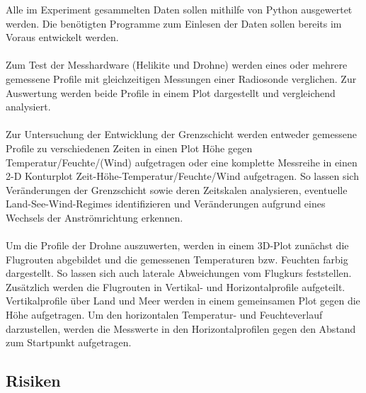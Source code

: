 \documentclass[a4paper,11pt,DIV=calc,tablecaptionabove,headinclude,twoside]{article}
\begin{document}
Alle im Experiment gesammelten Daten sollen mithilfe von Python ausgewertet werden. Die benötigten Programme zum Einlesen der Daten sollen bereits im Voraus entwickelt werden. \\\\
Zum Test der Messhardware (Helikite und Drohne) werden eines oder mehrere gemessene Profile mit gleichzeitigen Messungen einer Radiosonde verglichen. Zur Auswertung werden beide Profile in einem Plot dargestellt und vergleichend analysiert.\\\\
Zur Untersuchung der Entwicklung der Grenzschicht werden entweder gemessene Profile zu verschiedenen Zeiten in einen Plot Höhe gegen Temperatur/Feuchte/(Wind) aufgetragen oder eine komplette Messreihe in einen 2-D Konturplot Zeit-Höhe-Temperatur/Feuchte/Wind aufgetragen. So lassen sich Veränderungen der Grenzschicht sowie deren Zeitskalen analysieren, eventuelle Land-See-Wind-Regimes identifizieren und Veränderungen aufgrund eines Wechsels der Anströmrichtung erkennen.\\\\
Um die Profile der Drohne auszuwerten, werden in einem 3D-Plot zunächst die Flugrouten abgebildet und die gemessenen Temperaturen bzw. Feuchten farbig dargestellt. So lassen sich auch laterale Abweichungen vom Flugkurs feststellen. Zusätzlich werden die Flugrouten in Vertikal- und Horizontalprofile aufgeteilt. Vertikalprofile über Land und Meer werden in einem gemeinsamen Plot gegen die Höhe aufgetragen. Um den horizontalen Temperatur- und Feuchteverlauf darzustellen, werden die Messwerte in den Horizontalprofilen gegen den Abstand zum Startpunkt aufgetragen.    

\subsection{Risiken}
\label{Risiken}
\end{document}
